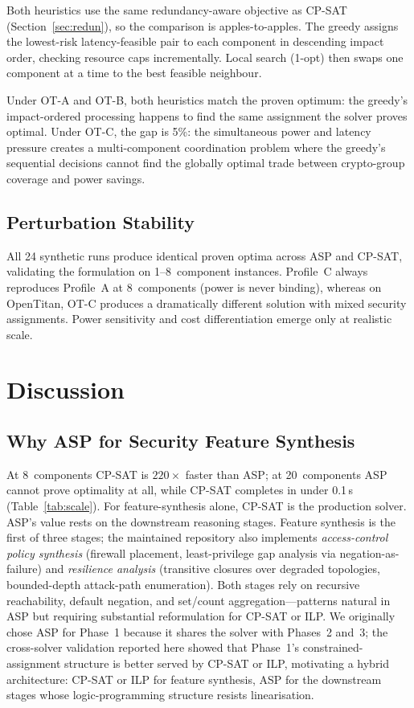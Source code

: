 \documentclass[conference]{IEEEtran}
\begin{document}
Both heuristics use the same redundancy-aware objective as CP-SAT
(Section~\ref{sec:redun}), so the comparison is apples-to-apples.
The greedy assigns the lowest-risk latency-feasible pair to each
component in descending impact order, checking resource caps
incrementally.  Local search (1-opt) then swaps one component at a
time to the best feasible neighbour.

Under OT-A and OT-B, both heuristics match the proven optimum:
the greedy's impact-ordered processing happens to find the same
assignment the solver proves optimal.  Under OT-C, the gap is 5\%:
the simultaneous power and latency pressure creates a
multi-component coordination problem where the greedy's sequential
decisions cannot find the globally optimal trade between
crypto-group coverage and power savings.

\subsection{Perturbation Stability}

All 24 synthetic runs produce identical proven optima across ASP and
CP-SAT, validating the formulation on 1--8~component instances.
Profile~C always reproduces Profile~A at 8~components (power is never
binding), whereas on OpenTitan, OT-C produces a dramatically
different solution with mixed security assignments. Power sensitivity
and cost differentiation emerge only at realistic scale.

\section{Discussion}

\subsection{Why ASP for Security Feature Synthesis}
\label{sec:whyasp}

At 8~components CP-SAT is $220\times$ faster than ASP; at
20~components ASP cannot prove optimality at all, while CP-SAT
completes in under 0.1\,s (Table~\ref{tab:scale}). For
feature-synthesis alone, CP-SAT is the production solver.
ASP's value rests on the downstream reasoning stages.
Feature synthesis is the first of three stages; the maintained
repository also implements \emph{access-control policy synthesis}
(firewall placement, least-privilege gap analysis via
negation-as-failure) and \emph{resilience analysis}
(transitive closures over degraded topologies,
bounded-depth attack-path enumeration). Both stages rely on
recursive reachability, default negation, and set/count
aggregation---patterns natural in ASP but requiring substantial
reformulation for CP-SAT or ILP.  We originally chose ASP for Phase~1
because it shares the solver with Phases~2 and~3; the cross-solver
validation reported here showed that Phase~1's constrained-assignment
structure is better served by CP-SAT or ILP, motivating a hybrid
architecture: CP-SAT or ILP for feature synthesis, ASP for the
downstream stages whose logic-programming structure resists
linearisation.
\end{document}
